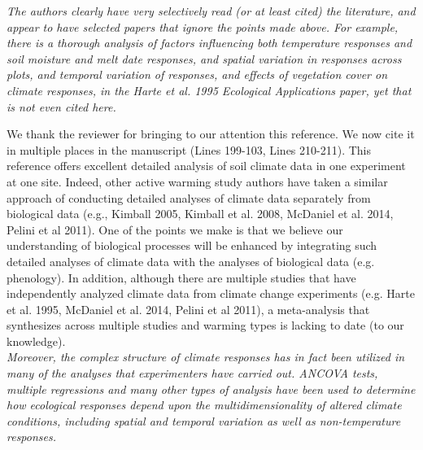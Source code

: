 \documentclass[11pt,a4paper]{letter}
\begin{document}
\begin{letter}{}
\emph{The authors clearly have very selectively read (or at least cited) the literature,  and appear to have selected papers that ignore the points made above.  For example, there is a  thorough analysis of factors influencing both temperature responses and soil moisture and melt date responses, and spatial variation in responses across plots,  and temporal variation of responses, and effects of vegetation cover on climate responses, in the Harte et al. 1995 Ecological Applications paper, yet that is not even cited here.}

We thank the reviewer for bringing to our attention this reference. We now cite it in multiple places in the manuscript (Lines 199-103, Lines 210-211). This reference offers excellent detailed analysis of soil climate data in one experiment at one site. Indeed, other active warming study authors have taken a similar approach of conducting detailed analyses of climate data separately from biological data (e.g., Kimball 2005, Kimball et al. 2008, McDaniel et al. 2014, Pelini et al 2011). One of the points we make is that we believe our understanding of biological processes will be enhanced by integrating such detailed analyses of climate data with the analyses of biological data (e.g. phenology). In addition, although there are multiple studies that have independently analyzed climate data from climate change experiments (e.g. Harte et al. 1995, McDaniel et al. 2014, Pelini et al 2011), a meta-analysis that synthesizes across multiple studies and warming types is lacking to date (to our knowledge).\\

\emph{Moreover, the complex structure of climate responses has in fact been utilized in many of the analyses that experimenters have carried out.  ANCOVA tests, multiple regressions and many other types of analysis have been used to determine how ecological responses depend upon the multidimensionality of altered climate conditions, including spatial and temporal variation as well as non-temperature responses.}


\end{letter}
\end{document}
